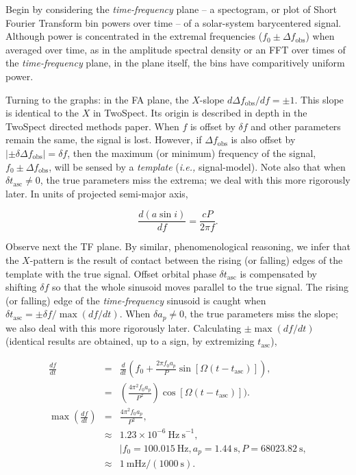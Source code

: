 \documentclass{article}
\begin{document}
Begin by considering the \textit{time-frequency} plane -- a spectogram, or plot of Short Fourier Transform bin powers over time -- of a solar-system barycentered signal.
Although power is concentrated in the extremal frequencies ($f_0 \pm \Delta f_\mathrm{obs}$) when averaged over time, as in the amplitude spectral density or an FFT over times of the \textit{time-frequency} plane, in the plane itself, the bins have comparitively uniform power.

Turning to the graphs: in the FA plane, the $X$-slope $d \Delta f_\mathrm{obs} / df = \pm1$.
This slope is identical to the $X$ in TwoSpect.
Its origin is described in depth in the TwoSpect directed methods paper.
When $f$ is offset by $\delta f$ and other parameters remain the same, the signal is lost.
However, if $\Delta f_\mathrm{obs}$ is also offset by $|\pm \delta \Delta f_\mathrm{obs}| = \delta f$, then the maximum (or minimum) frequency of the signal, $f_0 \pm \Delta f_\mathrm{obs}$, will be sensed by a \textit{template} (\textit{i.e.,} signal-model). 
Note also that when $\delta t_\mathrm{asc} \neq 0$, the true parameters miss the extrema; we deal with this more rigorously later.
In units of projected semi-major axis,

\begin{equation}
\frac{d (a \sin i)}{d f} = \frac{c P}{2 \pi f}.
\end{equation}

Observe next the TF plane.
By similar, phenomenological reasoning, we infer that the $X$-pattern is the result of contact between the rising (or falling) edges of the template with the true signal. 
Offset orbital phase $\delta t_\mathrm{asc}$ is compensated by shifting $\delta f$ so that the whole sinusoid moves parallel to the true signal.
The rising (or falling) edge of the \textit{time-frequency} sinusoid is caught when $\delta t_\mathrm{asc} = \pm \delta f / \max(df /dt)$.
When $\delta a_p \neq 0$, the true parameters miss the slope; we also deal with this more rigorously later.
Calculating $\pm \max \left(d f / d t\right)$ (identical results are obtained, up to a sign, by extremizing $t_\mathrm{asc}$),

\begin{eqnarray}
  \frac{df}{dt}
      &=& \frac{d}{dt} \left(f_0 + \frac{2 \pi f_0 a_p}{P} \sin \left[\Omega(t - t_\mathrm{asc})\right]\right),\\
      &=& \left(\frac{4 \pi^2 f_0 a_p}{P^2} \right) \cos[\Omega(t - t_\mathrm{asc})]). \\
  \max \left(\frac{df}{dt} \right)
      &=& \frac{4 \pi^2 f_0 a_p}{P^2},\\
      &\approx& 1.23 \times 10^{-6} \mathrm{~Hz~s}^{-1}, \nonumber\\
      &~& \mid {f_0 = 100.015\mathrm{~Hz}, a_p = 1.44\mathrm{~s}, P = 68023.82\mathrm{~s} },\\
      &\approx& 1\mathrm{~mHz} / (1000\mathrm{~s}).
\end{eqnarray}
\end{document}
